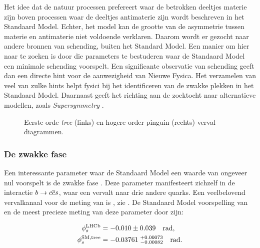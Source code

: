 Het idee dat de natuur processen prefereert waar de betrokken deeltjes materie zijn boven processen waar de deeltjes antimaterie zijn wordt beschreven in het Standaard Model. Echter, het model kan de grootte van de asymmetrie tussen materie en antimaterie niet voldoende verklaren. Daarom wordt er gezocht naar andere bronnen van \CP schending, buiten het Standard Model. Een manier om hier naar te zoeken is door  die parameters te bestuderen waar de Standaard Model een minimale \CP schending voorspelt. Een significante observatie van \CP schending geeft dan een directe hint voor de aanwezigheid van Nieuwe Fysica. Het verzamelen van veel van zulke hints helpt fysici bij het identificeren van de zwakke plekken in het Standaard Model. Daarnaast geeft het richting aan de zoektocht naar alternatieve modellen, zoals {\it Supersymmetry}  \eg \cite{Golfand:1971iw,Volkov:1973ix,Wess:1974tw}.


\begin{figure}[t]
  \begin{subfigure}{0.5\textwidth}
    \raggedright
    {\scalebox{1}{\sffamily }}
    \caption{}
    \label{app_nl_jpsiphi_tree}
  \end{subfigure}%
  \hfill
  \begin{subfigure}{0.5\textwidth}
    \raggedleft
    {\scalebox{1}{\sffamily }}
    \caption{}
    \label{app_nl_jpsiphi_peng}
  \end{subfigure}
     \caption{Eerste orde {\it tree} (links) en hogere order pinguin (rechts) \BsJpsiPhi verval diagrammen.}
  \label{app_nl_jpsiphi_tree_peng}
\end{figure}



\subsubsection{De zwakke fase \phis}
Een interessante parameter waar de Standaard Model een waarde van ongeveer nul voorspelt is de zwakke fase \phis. Deze parameter manifesteert zichzelf in de interactie $b\rightarrow c\overline {c}s$, waar een \bquark vervalt naar drie andere quarks. Een veelbelovend vervalkanaal voor de meting van \phis is \BsJpsiPhi, zie . De Standaard Model voorspelling van \phis en de meest precieze meting van deze parameter door \lhcb zijn:

\begin{subequations}
  \label{app_nl_phis_lhcb_theo}
  \begin{align}
  \centering
  \phiS{\lhcb}           &=  -0.010 \pm 0.039  \quad {\rm rad},
  \label{app_nl_phis_lhcb}\\
  \phiS{SM,tree}  &= -0.03761 \; ^{+0.00073}_{-0.00082}  \quad {\rm rad}.
  \label{app_nl_phis_theo}
\end{align}
\end{subequations}


